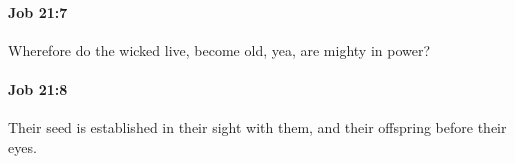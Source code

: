 		\paragraph{Job 21:7} %
			\label{JOB-21-7}

			Wherefore do the wicked live, become old, yea, are mighty in power?


		\paragraph{Job 21:8} %
			\label{JOB-21-8}

			Their seed is established in their sight with them, and their offspring before their eyes.


